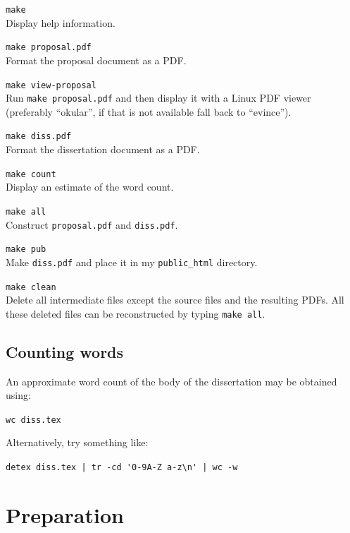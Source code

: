 \documentclass[12pt,a4paper,twoside,openright]{report}
\begin{document}
\begin{description}

\item\texttt{make} \\
 Display help information.

\item\texttt{make proposal.pdf} \\
 Format the proposal document as a PDF.

\item\texttt{make view-proposal} \\
 Run \texttt{make proposal.pdf} and then display it with a Linux PDF viewer
 (preferably ``okular'', if that is not available fall back to ``evince'').

\item\texttt{make diss.pdf} \\
 Format the dissertation document as a PDF.

\item\texttt{make count} \\
Display an estimate of the word count.

\item\texttt{make all} \\
Construct \texttt{proposal.pdf} and \texttt{diss.pdf}.

\item\texttt{make pub} \\ Make \texttt{diss.pdf}
and place it in my \texttt{public\_html} directory.

\item\texttt{make clean} \\ Delete all intermediate files except the
source files and the resulting PDFs. All these deleted files can
be reconstructed by typing \texttt{make all}.

\end{description}


\section{Counting words}

An approximate word count of the body of the dissertation may be
obtained using:

\texttt{wc diss.tex}

\noindent
Alternatively, try something like:

\verb/detex diss.tex | tr -cd '0-9A-Z a-z\n' | wc -w/


\chapter{Preparation}
\end{document}
